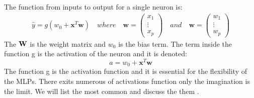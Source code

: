 The function from inputs to output for a single neuron is:
\begin{align}   
\hat{y}=g(w_0 + \bm{x}^T \bm{w}) \quad where \quad \bm{w}=\begin{pmatrix}
x_1 \\
\vdots\\
x_p
\end{pmatrix} \quad and \quad \bm{w}=\begin{pmatrix}
w_1 \\
\vdots \\
w_p
\end{pmatrix}
\end{align}
The $\mathbf{W}$ is the weight matrix and $w_0$ is the bias term. The term inside the function g is the activation of the neuron and it is denoted:
$$a= w_0 + \bm{x}^T \bm{w}$$
The function g is the activation function and it is essential for the flexibility of the MLPs. There exits numerous of activations function only the imagination is the limit. We will list the most common and discuss the them \parencite{Mackay18}.


